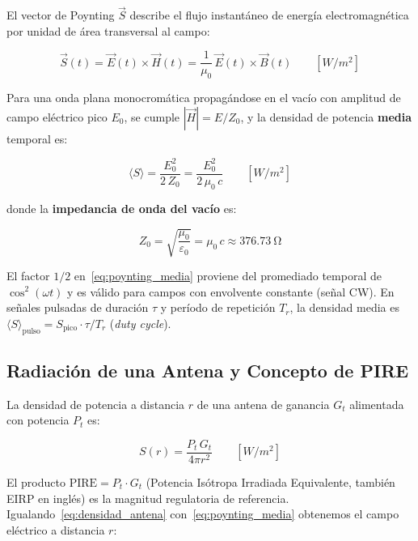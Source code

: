 \documentclass[12pt,a4paper]{article}
\begin{document}
El vector de Poynting $\vec{S}$ describe el flujo instantáneo de energía
electromagnética por unidad de área transversal al campo:

\begin{equation}
  \vec{S}(t) = \vec{E}(t) \times \vec{H}(t)
             = \frac{1}{\mu_0}\,\vec{E}(t) \times \vec{B}(t)
  \qquad \left[\si{W/m^2}\right]
  \label{eq:poynting_instantaneo}
\end{equation}

Para una onda plana monocromática propagándose en el vacío con amplitud de
campo eléctrico pico $E_0$, se cumple $|\vec{H}| = E/Z_0$, y la densidad
de potencia \textbf{media} temporal es:

\begin{equation}
  \boxed{
    \langle S \rangle = \frac{E_0^2}{2\,Z_0} = \frac{E_0^2}{2\,\mu_0\,c}
  }
  \qquad \left[\si{W/m^2}\right]
  \label{eq:poynting_media}
\end{equation}

donde la \textbf{impedancia de onda del vacío} es:

\begin{equation}
  Z_0 = \sqrt{\frac{\mu_0}{\varepsilon_0}} = \mu_0\,c \approx \SI{376.73}{\ohm}
  \label{eq:Z0}
\end{equation}

\begin{notatec}
  El factor $1/2$ en~\eqref{eq:poynting_media} proviene del promediado
  temporal de $\cos^2(\omega t)$ y es válido para campos con envolvente
  constante (señal CW). En señales pulsadas de duración $\tau$ y período
  de repetición $T_r$, la densidad media es
  $\langle S \rangle_\text{pulso} = S_\text{pico} \cdot \tau/T_r$
  (\textit{duty cycle}).
\end{notatec}

\subsection{Radiación de una Antena y Concepto de PIRE}

La densidad de potencia a distancia $r$ de una antena de ganancia $G_t$
alimentada con potencia $P_t$ es:

\begin{equation}
  S(r) = \frac{P_t\,G_t}{4\pi r^2}
  \qquad \left[\si{W/m^2}\right]
  \label{eq:densidad_antena}
\end{equation}

El producto $\mathrm{PIRE} = P_t \cdot G_t$ (Potencia Isótropa
Irradiada Equivalente, también EIRP en inglés) es la magnitud
regulatoria de referencia. Igualando~\eqref{eq:densidad_antena}
con~\eqref{eq:poynting_media} obtenemos el campo eléctrico a distancia $r$:
\end{document}

